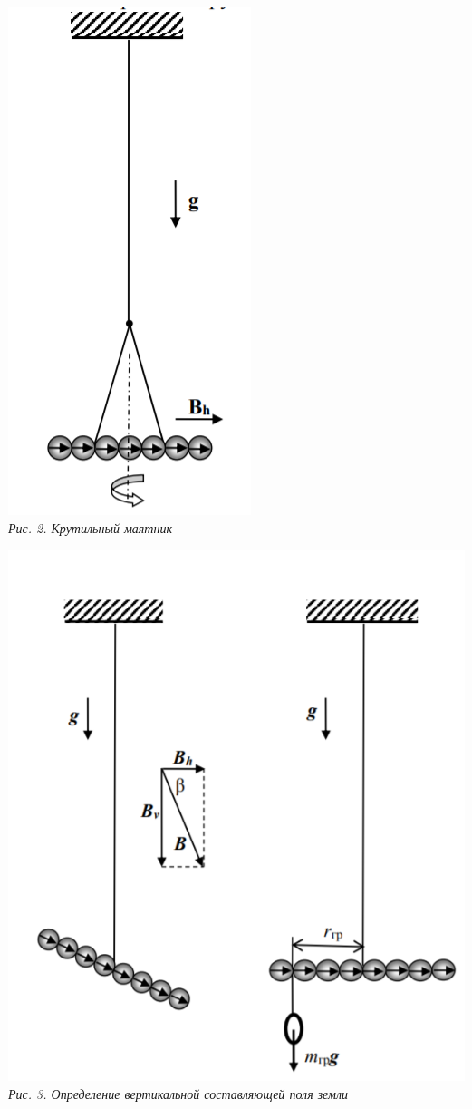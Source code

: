 \begin{center}
{\begin{center}
        \includegraphics[scale=0.3]{picks/121-scheme2.png} \\
        \textit{Рис. 2. Крутильный маятник}
    
    \end{center}
}
\shiftedText{0.1cm}{6cm}
{
    \begin{center}

        \includegraphics[scale=0.3]{picks/121-scheme3.png} \\
        \textit{Рис. 3. Определение вертикальной составляющей поля земли}


\end{center}}
\end{center}
